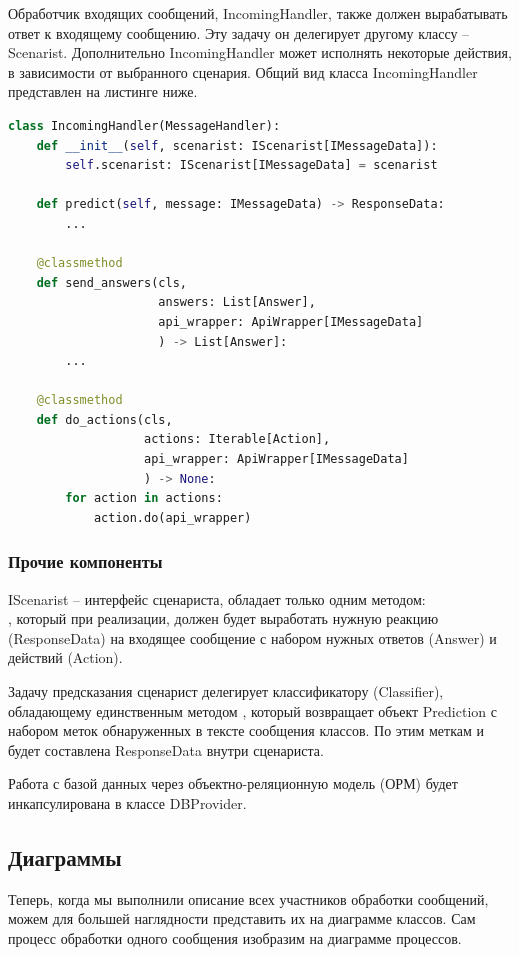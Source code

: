     Обработчик входящих сообщений, IncomingHandler, также должен вырабатывать ответ
    к входящему сообщению. Эту задачу он делегирует другому классу -- Scenarist.
    Дополнительно IncomingHandler может исполнять некоторые действия,
    в зависимости от выбранного сценария.
    Общий вид класса IncomingHandler представлен на листинге ниже.
\begin{lstlisting}[language=Python]
class IncomingHandler(MessageHandler):
    def __init__(self, scenarist: IScenarist[IMessageData]):
        self.scenarist: IScenarist[IMessageData] = scenarist

    def predict(self, message: IMessageData) -> ResponseData:
        ...

    @classmethod
    def send_answers(cls,
                     answers: List[Answer],
                     api_wrapper: ApiWrapper[IMessageData]
                     ) -> List[Answer]:
        ...

    @classmethod
    def do_actions(cls,
                   actions: Iterable[Action], 
                   api_wrapper: ApiWrapper[IMessageData]
                   ) -> None:
        for action in actions:
            action.do(api_wrapper)
\end{lstlisting}

    \subsubsection*{Прочие компоненты}
    IScenarist -- интерфейс сценариста, обладает только одним методом:\\
    , который при реализации, должен будет
    выработать нужную реакцию (ResponseData) на входящее сообщение с набором
    нужных ответов (Answer) и действий (Action).

    Задачу предсказания сценарист делегирует классификатору (Classifier),
    обладающему единственным методом , который
    возвращает объект Prediction с набором меток обнаруженных в тексте сообщения классов.
    По этим меткам и будет составлена ResponseData внутри сценариста.

    Работа с базой данных через объектно-реляционную модель (ОРМ) будет инкапсулирована
    в классе DBProvider.

    \subsection{Диаграммы}
    Теперь, когда мы выполнили описание всех участников обработки сообщений,
    можем для большей наглядности представить их на диаграмме классов. Сам процесс
    обработки одного сообщения изобразим на диаграмме процессов.

